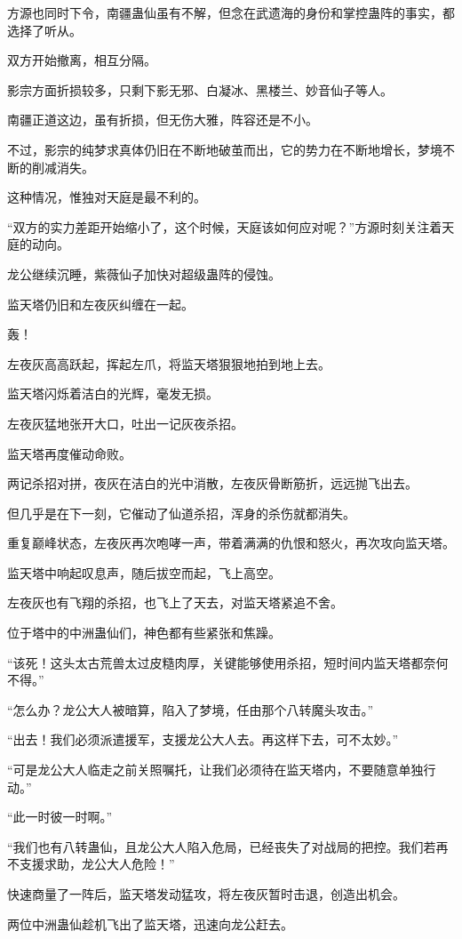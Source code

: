 \begin{this_body}
方源也同时下令，南疆蛊仙虽有不解，但念在武遗海的身份和掌控蛊阵的事实，都选择了听从。

双方开始撤离，相互分隔。

影宗方面折损较多，只剩下影无邪、白凝冰、黑楼兰、妙音仙子等人。

南疆正道这边，虽有折损，但无伤大雅，阵容还是不小。

不过，影宗的纯梦求真体仍旧在不断地破茧而出，它的势力在不断地增长，梦境不断的削减消失。

这种情况，惟独对天庭是最不利的。

“双方的实力差距开始缩小了，这个时候，天庭该如何应对呢？”方源时刻关注着天庭的动向。

龙公继续沉睡，紫薇仙子加快对超级蛊阵的侵蚀。

监天塔仍旧和左夜灰纠缠在一起。

轰！

左夜灰高高跃起，挥起左爪，将监天塔狠狠地拍到地上去。

监天塔闪烁着洁白的光辉，毫发无损。

左夜灰猛地张开大口，吐出一记灰夜杀招。

监天塔再度催动命败。

两记杀招对拼，夜灰在洁白的光中消散，左夜灰骨断筋折，远远抛飞出去。

但几乎是在下一刻，它催动了仙道杀招，浑身的杀伤就都消失。

重复巅峰状态，左夜灰再次咆哮一声，带着满满的仇恨和怒火，再次攻向监天塔。

监天塔中响起叹息声，随后拔空而起，飞上高空。

左夜灰也有飞翔的杀招，也飞上了天去，对监天塔紧追不舍。

位于塔中的中洲蛊仙们，神色都有些紧张和焦躁。

“该死！这头太古荒兽太过皮糙肉厚，关键能够使用杀招，短时间内监天塔都奈何不得。”

“怎么办？龙公大人被暗算，陷入了梦境，任由那个八转魔头攻击。”

“出去！我们必须派遣援军，支援龙公大人去。再这样下去，可不太妙。”

“可是龙公大人临走之前关照嘱托，让我们必须待在监天塔内，不要随意单独行动。”

“此一时彼一时啊。”

“我们也有八转蛊仙，且龙公大人陷入危局，已经丧失了对战局的把控。我们若再不支援求助，龙公大人危险！”

快速商量了一阵后，监天塔发动猛攻，将左夜灰暂时击退，创造出机会。

两位中洲蛊仙趁机飞出了监天塔，迅速向龙公赶去。


\end{this_body}
